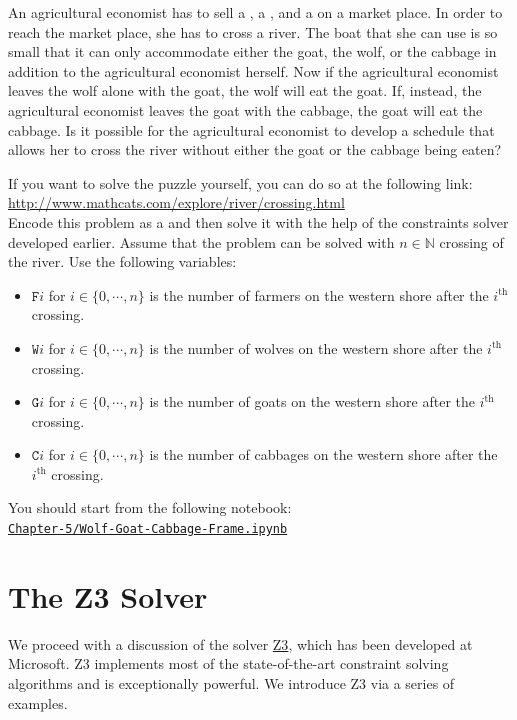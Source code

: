\exerciseEng
An agricultural economist has to sell a , a , and a 
on a market place.  In order to reach the market place, she has to cross a river.  The
boat that she can use is so small that it can only accommodate either the goat, the wolf,
or the cabbage in addition to the agricultural economist herself.  Now if the agricultural
economist leaves the wolf alone with the goat, the wolf will eat the goat.  If, instead,
the agricultural economist leaves the goat with the cabbage, the goat will eat the
cabbage.  Is it possible for the agricultural economist to develop a schedule that allows
her to cross the river without either the goat or the cabbage being eaten?

If you want to solve the puzzle yourself, you can do so at the following link:
\\[0.2cm]
\hspace*{1.3cm}
\href{http://www.mathcats.com/explore/river/crossing.html}{http://www.mathcats.com/explore/river/crossing.html}
\\[0.2cm]
Encode this problem as a  and then solve it with the help
of the constraints solver developed earlier.  Assume that the
problem can be solved with $n\in\mathbb{N}$ crossing of the river.  Use the following
variables:
\begin{itemize}
\item $\texttt{F}i$ for $i\in\{0,\cdots,n\}$ is the number of farmers on the western shore after the 
      $i^{\textrm{th}}$ crossing.
\item $\texttt{W}i$ for $i\in\{0,\cdots,n\}$ is the number of wolves on the western shore after the 
      $i^{\textrm{th}}$ crossing.
\item $\texttt{G}i$ for $i\in\{0,\cdots,n\}$ is the number of goats on the western shore after the 
      $i^{\textrm{th}}$ crossing.
\item $\texttt{C}i$ for $i\in\{0,\cdots,n\}$ is the number of cabbages on the western shore after the 
      $i^{\textrm{th}}$ crossing.
\end{itemize}
You should start from the following notebook:
\\[0.2cm]
\hspace*{1.3cm}
\href{https://github.com/karlstroetmann/Logic/blob/master/TypeScript/Chapter-5/Wolf-Goat-Cabbage-Frame.ipynb}{\texttt{Chapter-5/Wolf-Goat-Cabbage-Frame.ipynb}}
\eox

\section{The Z3 Solver}
We proceed with a discussion of the solver
\href{https://www.microsoft.com/en-us/research/project/z3-3/}{Z3}, which has been developed
at Microsoft.  Z3 implements most of the state-of-the-art constraint solving algorithms
and is exceptionally powerful.  We introduce Z3 via a series of examples.

